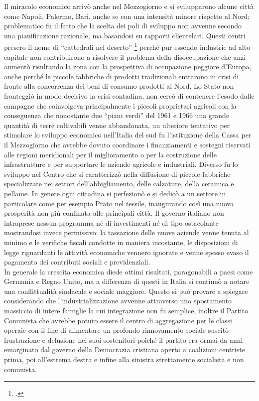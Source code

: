 Il miracolo economico arrivò anche nel Mezzogiorno e si svilupparono alcune città come Napoli, Palermo, Bari, anche se con una intensità minore rispetto al Nord; problematico fu il fatto che la scelta dei poli di sviluppo non avvenne secondo una pianificazione razionale, ma basandosi su rapporti clientelari.
Questi centri presero il nome di \enquote{cattedrali nel deserto} \footcite{Ginsborg3} perché pur essendo industrie ad alto capitale non contribuirono a risolvere il problema della disoccupazione che anzi aumentò risultando la zona con la prospettiva di occupazione peggiore d'Europa, anche perché le piccole fabbriche di prodotti tradizionali entrarono in crisi di fronte alla concorrenza dei beni di consumo prodotti al Nord.
Lo Stato non fronteggiò in modo decisivo la crisi contadina, non cercò di contenere l'esodo dalle campagne che coinvolgeva principalmente i piccoli proprietari agricoli con la conseguenza che nonostante due \enquote{piani verdi} del 1961 e 1966 una grande quantità di terre coltivabili venne abbandonata, un ulteriore tentativo per stimolare lo sviluppo economico nell'Italia del sud fu l'istituzione della Cassa per il Mezzogiorno che avrebbe dovuto coordinare i finanziamenti e sostegni riservati alle regioni meridionali per il miglioramento o per la costruzione delle infrastrutture e per supportare le aziende agricole e industriali.
Diverso fu lo sviluppo nel Centro che si caratterizzò nella diffusione di piccole fabbriche specializzate nei settori dell'abbigliamento, delle calzature, della ceramica e pellame.
In genere ogni cittadina si perfezionò e si dedicò a un settore in particolare come per esempio Prato nel tessile, inaugurando così una nuova prosperità non più confinata alle principali città.
Il governo italiano non intraprese nessun programma né di investimenti né di tipo ostacolante mostrandosi invece permissivo: la tassazione delle nuove aziende venne tenuta al minimo e le verifiche fiscali condotte in maniera incostante, le disposizioni di legge riguardanti le attività economiche vennero ignorate e venne spesso evaso il pagamento dei contributi sociali e previdenziali.
\\In generale la crescita economica diede ottimi risultati, paragonabili a paesi come Germania e Regno Unito, ma a differenza di questi in Italia si continuò a notare una conflittualità sindacale e sociale maggiore. Questo si può provare a spiegare considerando che l'industrializzazione avvenne attraverso uno spostamento massiccio di intere famiglie la cui integrazione non fu semplice, inoltre il Partito Comunista che avrebbe potuto essere il centro di aggregazione per le classi operaie con il fine di alimentare un profondo rinnovamento sociale suscitò frustrazione e delusione nei suoi sostenitori poiché il partito era ormai da anni emarginato dal governo della Democrazia cristiana aperto a coalizioni centriste prima, poi all'estrema destra e infine alla sinistra strettamente socialista e non comunista.
